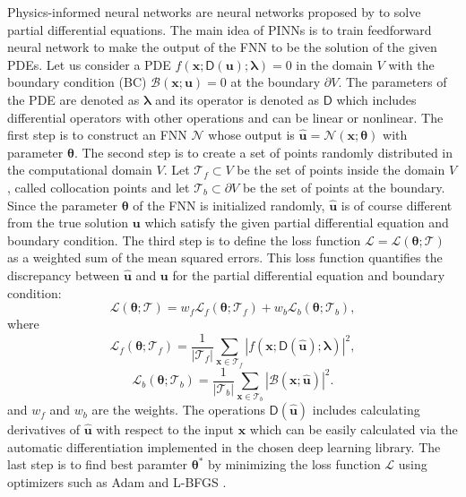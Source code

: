 Physics-informed neural networks are neural networks proposed by \parencite{raissi2019physics} to solve partial differential equations. The main idea of PINNs is to train feedforward neural network to make the output of the FNN to be the solution of the given PDEs. 
Let us consider a PDE $f(\boldsymbol{x}; \mathsf{D}(\boldsymbol{u}); \boldsymbol{\lambda})=0$ in the domain $V$ with the boundary condition (BC) $\mathcal{B}(\boldsymbol{x}; \boldsymbol{u})=0$ at the boundary $\partial V$. The parameters of the PDE are denoted as $\boldsymbol{\lambda}$ and its operator is denoted as $\mathsf{D}$ which includes differential operators with other operations and can be linear or nonlinear. The first step is to construct an FNN $\mathcal{N}$ whose output is $\boldsymbol{\hat{u}} = \mathcal{N}(\boldsymbol{x}; \boldsymbol{\theta})$ with parameter $\boldsymbol{\theta}$. The second step is to create a set of points randomly distributed in the computational domain $V$. Let $\mathcal{T}_{f} \subset V$ be the set of points inside the domain $V$, called collocation points and let  $\mathcal{T}_{b} \subset \partial V$ be the set of points at the boundary. Since the parameter $\boldsymbol{\theta}$ of the FNN is initialized randomly, $\boldsymbol{\hat{u}}$ is of course different from the true solution $\boldsymbol{u}$ which satisfy the given partial differential equation and boundary condition. The third step is to define the loss function $\mathcal{L}=\mathcal{L}(\boldsymbol{\theta};\mathcal{T})$ as a weighted sum of the mean squared errors. This loss function quantifies the discrepancy between $\boldsymbol{\hat{u}}$ and $\boldsymbol{u}$ for the partial differential equation and boundary condition:
\begin{equation*}
    \mathcal{L}(\boldsymbol{\theta};\mathcal{T}) = w_{f}\mathcal{L}_{f}(\boldsymbol{\theta}; \mathcal{T}_f) +  w_{b}\mathcal{L}_{b}(\boldsymbol{\theta}; \mathcal{T}_b),
\end{equation*}
where
\begin{equation*}
    \mathcal{L}_f(\boldsymbol{\theta};\mathcal{T}_f)=\frac{1}{|\mathcal{T}_f|}\sum_{\boldsymbol{x}\in\mathcal{T}_f}{|f(\boldsymbol{x}; \mathsf{D}(\boldsymbol{\hat{u}}); \boldsymbol{\lambda})|^2},
\end{equation*}
\begin{equation*}
    \mathcal{L}_b(\boldsymbol{\theta};\mathcal{T}_b)=\frac{1}{|\mathcal{T}_b|}\sum_{\boldsymbol{x}\in\mathcal{T}_b}{|\mathcal{B}(\boldsymbol{x};\boldsymbol{\hat{u}})|^2}.
\end{equation*}
and $w_f$ and $w_b$ are the weights. The operations $\mathsf{D}(\boldsymbol{\hat{u}})$ includes calculating derivatives of $\boldsymbol{\hat{u}}$ with respect to the input $\boldsymbol{x}$ which can be easily calculated via the automatic differentiation implemented in the chosen deep learning library. The last step is to find best paramter $\boldsymbol{\theta}^{*}$ by minimizing the loss function $\mathcal{L}$ using optimizers such as Adam \parencite{kingma2014adam} and L-BFGS \parencite{zhu1995limited}.

